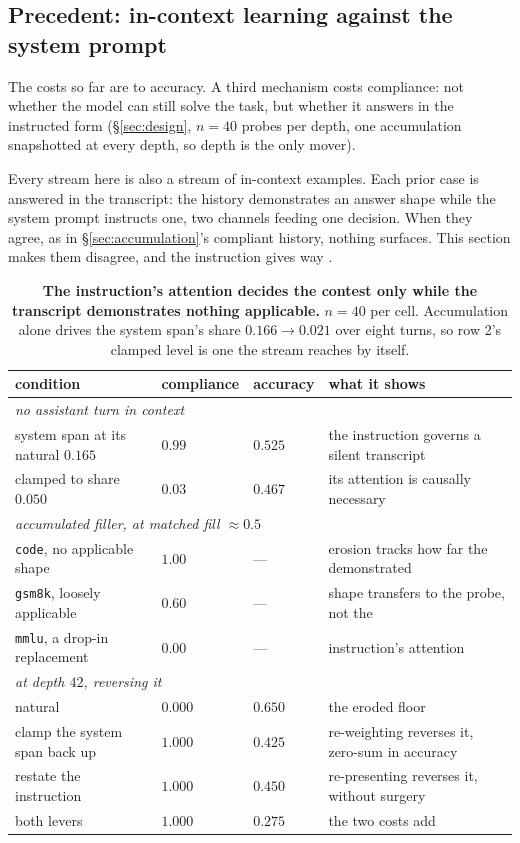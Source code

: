 \documentclass{article}
\begin{document}
\subsection{Precedent: in-context learning against the system prompt}
\label{sec:precedent}

The costs so far are to accuracy. A third mechanism costs compliance: not whether the
model can still solve the task, but whether it answers in the instructed form
(\S\ref{sec:design}, $n{=}40$ probes per depth, one accumulation snapshotted at every depth, so
depth is the only mover).

Every stream here is also a stream of in-context examples. Each prior case is answered in the
transcript: the history demonstrates an answer shape while the system prompt
instructs one, two channels feeding one decision. When they agree, as in
\S\ref{sec:accumulation}'s compliant history, nothing surfaces. This section makes them
disagree, and the instruction gives way \citep[cf.][]{anil2024manyshot}.

\begin{table}[t]
  \centering\small
  \caption{\textbf{The instruction's attention decides the contest only while the transcript
  demonstrates nothing applicable.} $n{=}40$ per cell. Accumulation alone drives the system
  span's share $0.166\to0.021$ over eight turns, so row 2's clamped level is one the stream
  reaches by itself.}
  \label{tab:precedent}
  \setlength{\tabcolsep}{4pt}
  \begin{tabular}{llll}
    \toprule
    condition & compliance & accuracy & what it shows\\
    \midrule
    \multicolumn{4}{l}{\textit{no assistant turn in context}}\\
    system span at its natural $0.165$ & $0.99$ & $0.525$ & the instruction governs a silent transcript\\
    clamped to share $0.050$ & $0.03$ & $0.467$ & its attention is causally necessary\\
    \midrule
    \multicolumn{4}{l}{\textit{accumulated filler, at matched fill ${\approx}0.5$}}\\
    \texttt{code}, no applicable shape & $1.00$ & --- & erosion tracks how far the demonstrated\\
    \texttt{gsm8k}, loosely applicable & $0.60$ & --- & \quad shape transfers to the probe, not the\\
    \texttt{mmlu}, a drop-in replacement & $0.00$ & --- & \quad instruction's attention\\
    \midrule
    \multicolumn{4}{l}{\textit{at depth $42$, reversing it}}\\
    natural & $0.000$ & $0.650$ & the eroded floor\\
    clamp the system span back up & $1.000$ & $0.425$ & re-weighting reverses it, zero-sum in accuracy\\
    restate the instruction & $1.000$ & $0.450$ & re-presenting reverses it, without surgery\\
    both levers & $1.000$ & $0.275$ & the two costs add\\
    \bottomrule
  \end{tabular}
\end{table}
\end{document}
